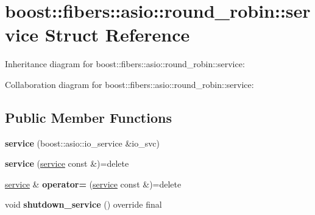 \hypertarget{structboost_1_1fibers_1_1asio_1_1round__robin_1_1service}{}\section{boost\+:\+:fibers\+:\+:asio\+:\+:round\+\_\+robin\+:\+:service Struct Reference}
\label{structboost_1_1fibers_1_1asio_1_1round__robin_1_1service}


Inheritance diagram for boost\+:\+:fibers\+:\+:asio\+:\+:round\+\_\+robin\+:\+:service\+:


Collaboration diagram for boost\+:\+:fibers\+:\+:asio\+:\+:round\+\_\+robin\+:\+:service\+:
\subsection*{Public Member Functions}
\begin{DoxyCompactItemize}
\item 
\mbox{\label{structboost_1_1fibers_1_1asio_1_1round__robin_1_1service_a5a70b1f98352210c028ec6c7b0b4c551}} 
{\bfseries service} (boost\+::asio\+::io\+\_\+service \&io\+\_\+svc)
\item 
\mbox{\label{structboost_1_1fibers_1_1asio_1_1round__robin_1_1service_ab91aa937da14f49271578bbe5f29f2c3}} 
{\bfseries service} (\mbox{\hyperlink{structboost_1_1fibers_1_1asio_1_1round__robin_1_1service}{service}} const \&)=delete
\item 
\mbox{\label{structboost_1_1fibers_1_1asio_1_1round__robin_1_1service_afe4825730e4f7d289f07aab11a5c53fd}} 
\mbox{\hyperlink{structboost_1_1fibers_1_1asio_1_1round__robin_1_1service}{service}} \& {\bfseries operator=} (\mbox{\hyperlink{structboost_1_1fibers_1_1asio_1_1round__robin_1_1service}{service}} const \&)=delete
\item 
\mbox{\label{structboost_1_1fibers_1_1asio_1_1round__robin_1_1service_a627fd1ef2f8de4047e825d7077751fa8}} 
void {\bfseries shutdown\+\_\+service} () override final
\end{DoxyCompactItemize}
